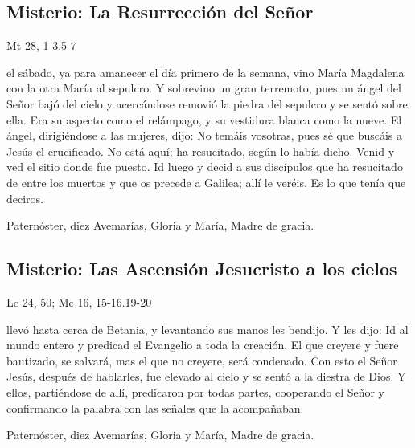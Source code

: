 \documentclass[./main.tex]{subfiles}
\newcounter{glorious-counter}
\begin{document}
\subsection*{ Misterio: La Resurrección del Señor}
\begin{flushright}
      {\color{red}Mt 28, 1-3.5-7}
\end{flushright}
 el sábado, ya para amanecer el día primero de la semana, vino María Magdalena con la otra María al sepulcro. Y sobrevino un gran terremoto, 
pues un ángel del Señor bajó del cielo y acercándose removió la piedra del sepulcro y se sentó sobre ella. Era su aspecto como el relámpago, y su vestidura blanca como la nueve. 
El ángel, dirigiéndose a las mujeres, dijo: No temáis vosotras, pues sé que buscáis a Jesús el crucificado. No está aquí; ha resucitado, según lo había dicho. 
Venid y ved el sitio donde fue puesto. Id luego y decid a sus discípulos que ha resucitado de entre los muertos y que os precede a Galilea; allí le veréis. 
Es lo que tenía que deciros.

\begin{center}
      Paternóster, diez Avemarías, Gloria y María, Madre de gracia.
\end{center}

\subsection*{ Misterio: Las Ascensión Jesucristo a los cielos}
\begin{flushright}
      {\color{red}Lc 24, 50; Mc 16, 15-16.19-20}
\end{flushright}
 llevó hasta cerca de Betania, y levantando sus manos les bendijo. Y les dijo: Id al mundo entero y predicad el Evangelio a toda la creación. 
El que creyere y fuere bautizado, se salvará, mas el que no creyere, será condenado. Con esto el Señor Jesús, después de hablarles, fue elevado al cielo y se sentó a la diestra de Dios. 
Y ellos, partiéndose de allí, predicaron por todas partes, cooperando el Señor y confirmando la palabra con las señales que la acompañaban.

\begin{center}
      Paternóster, diez Avemarías, Gloria y María, Madre de gracia.
\end{center}

\end{document}

